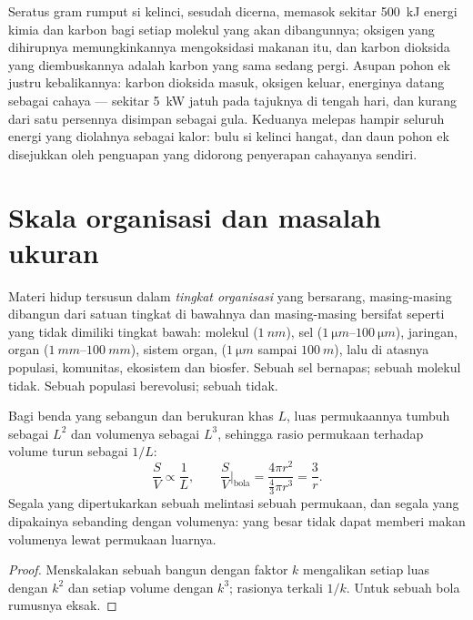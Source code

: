 \begin{example}\label{ex:b1:organism-environment:rabbitoak}
Seratus gram rumput si kelinci, sesudah dicerna, memasok sekitar
\qty{500}{kJ} energi kimia dan karbon bagi setiap molekul yang akan
dibangunnya; oksigen yang dihirupnya memungkinkannya mengoksidasi
makanan itu, dan karbon dioksida yang diembuskannya adalah karbon yang
sama sedang pergi. Asupan pohon ek justru kebalikannya: karbon dioksida
masuk, oksigen keluar, energinya datang sebagai cahaya --- sekitar
\qty{5}{kW} jatuh pada tajuknya di tengah hari, dan kurang dari satu
persennya disimpan sebagai gula. Keduanya melepas hampir seluruh energi
yang diolahnya sebagai kalor: bulu si kelinci hangat, dan daun pohon ek
disejukkan oleh penguapan yang didorong penyerapan cahayanya sendiri.
\end{example}

\section{Skala organisasi dan masalah ukuran}

\begin{definition}\label{def:b1:organism-environment:levels}
Materi hidup tersusun dalam \emph{tingkat
organisasi} yang bersarang, masing-masing
dibangun dari satuan tingkat di bawahnya dan masing-masing bersifat
seperti yang tidak dimiliki tingkat bawah: molekul ($\qty{1}{nm}$), sel
($\qtyrange{1}{100}{\micro m}$), jaringan, organ
($\qtyrange{1}{100}{mm}$), sistem organ,  ($\qty{1}{\micro m}$
sampai $\qty{100}{m}$), lalu di atasnya populasi, komunitas, ekosistem
dan biosfer. Sebuah sel bernapas; sebuah molekul tidak. Sebuah populasi
berevolusi; sebuah  tidak.
\end{definition}

\begin{proposition}\label{prop:b1:organism-environment:sv}
Bagi benda yang sebangun dan berukuran khas $L$, luas permukaannya
tumbuh sebagai $L^2$ dan volumenya sebagai $L^3$, sehingga rasio
permukaan terhadap volume turun sebagai $1/L$:
\[
\frac{S}{V} \propto \frac{1}{L}, \qquad
\frac{S}{V}\Big|_{\text{bola}} = \frac{4\pi r^2}{\tfrac{4}{3}\pi r^3} = \frac{3}{r}.
\]
Segala yang dipertukarkan sebuah  melintasi sebuah permukaan,
dan segala yang dipakainya sebanding dengan volumenya:  yang
besar tidak dapat memberi makan volumenya lewat permukaan luarnya.
\end{proposition}
\begin{proof}
Menskalakan sebuah bangun dengan faktor $k$ mengalikan setiap luas
dengan $k^2$ dan setiap volume dengan $k^3$; rasionya terkali $1/k$.
Untuk sebuah bola rumusnya eksak.
\end{proof}

